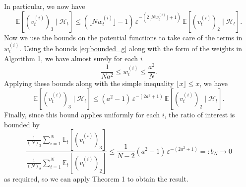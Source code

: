 \documentclass[fleqn]{article}
\theoremstyle{definition}
\newcommand{\E}{\mathbb{E}}
\newcommand{\1}[1]{\mathbbm{1}_{\{#1\}}}
\newcommand{\vt}[2][t]{v_{#1}^{(#2)}}
\newcommand{\wt}[2][t]{w_{#1}^{(#2)}}
\newcommand{\flnw}{\lfloor N\wt{i} \rfloor }
\begin{document}
In particular, we now have
\begin{equation*}
\E[(\vt{i})_3 \mid \mathcal{H}_t] 
\leq  (\flnw -1 ) \, \varepsilon^{-(2\flnw +1)} \, \E[(\vt{i})_2 \mid \mathcal{H}_t] .
\end{equation*}
Now we use the bounds on the potential functions to take care of the terms in $\wt{i}$. Using the bounds \eqref{eq:bounded_g} along with the form of the weights in Algorithm 1, we have almost surely for each $i$
\begin{equation*}
\frac{1}{Na^2} \leq \wt{i} \leq \frac{a^2}{N} .
\end{equation*}
Applying these bounds along with the simple inequality $\lfloor x\rfloor \leq x$, we have
\begin{equation*}
\E[(\vt{i})_3 \mid \mathcal{H}_t] \leq (a^2 -1 )\, \varepsilon^{-(2 a^2 +1)}\, \E[(\vt{i})_2 \mid \mathcal{H}_t] .
\end{equation*}
Finally, since this bound applies uniformly for each $i$, the ratio of interest is bounded by
\begin{equation*}
\frac{\frac{1}{(N)_3} \sum_{i=1}^N \E_t[(\vt{i})_3]}{\frac{1}{(N)_2} \sum_{i=1}^N \E_t[(\vt{i})_2]}
\leq \frac{1}{N-2}(a^2 -1 )\, \varepsilon^{-(2a^2 +1)}  =: b_N \to 0
\end{equation*}
as required, so we can apply Theorem 1 to obtain the result.



\end{document}
